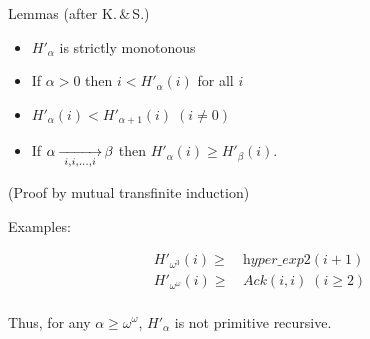 \documentclass[10pt, fleqn]{beamer}
\begin{document}
 



\begin{frame}[fragile, label={fgflemmas}]

\begin{block}{Lemmas (after K.\,\&\,S.)}
   \begin{itemize} 
    \item \textcolor{mathcolor}{$H'_\alpha$} is strictly monotonous
    
     \item  If $\alpha>0$ then \textcolor{mathcolor}{$ i < H'_\alpha(i)$} for all $i$
    
    \item   $H'_\alpha(i) < H'_{\alpha+1}(i) \; (i \not=0)$
    
       \item     If \textcolor{mathcolor}{$\alpha \rplus{i,i,\dots,i} \beta$} then \textcolor{mathcolor}{$H'_\alpha(i)\geq H'_\beta(i)$}.
         

       \end{itemize}
       (Proof by mutual transfinite induction)
 \end{block}  

 \begin{block}{Examples:}
         
      {\color{mathcolor}
      
        \begin{align*}
      H'_{\omega^3}(i) \geq\, & \textit{hyper\_exp2}(i+1) \\
      H'_{\omega^\omega}(i)\geq\,& \textit{Ack}(i,i)\; (i\geq 2)\\
    \end{align*}
  }%
 Thus, for any \textcolor{mathcolor}{$\alpha\geq\omega^\omega$}, \textcolor{mathcolor}{$H'_\alpha$} is not primitive recursive.
  \end{block}
  
    
\end{frame}
 




    
\end{document}
